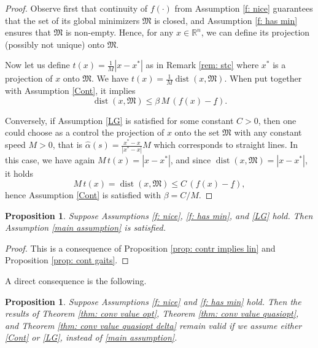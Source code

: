 \documentclass[12pt]{amsart}
\numberwithin{equation}{section}
\theoremstyle{plain}
\newtheorem{proposition}[theorem]{Proposition}
\begin{document}
\begin{proof}
Observe first that continuity of $f(\cdot)$ from Assumption \ref{f: nice} guarantees that the set of its global minimizers $\mathfrak{M}$ is closed, and Assumption \ref{f: has min} ensures that $\mathfrak{M}$ is non-empty. Hence, for any $x\in\mathbb{R}^{n}$, we can define its projection (possibly not unique) onto $\mathfrak{M}$. 

Now let us define 
$t(x) = \frac{1}{M}|x-x^{*}|$ as in Remark \ref{rem: stc} where $x^{*}$ is a projection of $x$ onto $\mathfrak{M}$. We have $t(x) = \frac{1}{M}\operatorname{dist}(x,\mathfrak{M})$. When put together with Assumption \ref{Cont}, it implies  
\begin{equation*}%
    \operatorname{dist}(x,\mathfrak{M}) \leq \beta \,M\, (f(x)-\underline{f}).
\end{equation*}

Conversely, if Assumption \ref{LG} is satisfied for some constant $C>0$, then one could choose as a control the projection of $x$ onto the set $\mathfrak{M}$ with any constant speed $M>0$, that is $\hat{\alpha}(s) = \frac{x^{*} - x}{|x^{*} - x|}M$ which corresponds to straight lines. In this case, we have again $M\,t(x) = |x-x^{*}|$, and since $\operatorname{dist}(x,\mathfrak{M}) = |x-x^{*}|$, it holds
\begin{equation*}
    M\,t(x) = \operatorname{dist}(x,\mathfrak{M}) \leq C\, (f(x)-\underline{f}),
\end{equation*}
hence Assumption \ref{Cont} is satisfied with $\beta = C/M$.
\end{proof}

\begin{proposition}
Suppose Assumptions \ref{f: nice}, \ref{f: has min}, and \ref{LG} hold. Then Assumption \ref{main assumption} is satisfied. 
\end{proposition}

\begin{proof}
This is a consequence of  Proposition \ref{prop: contr implies lin} and Proposition \ref{prop: cont gaits}.
\end{proof}


A direct consequence is the following.

\begin{proposition}\label{prop: equiv to B}
Suppose Assumptions \ref{f: nice} and \ref{f: has min} hold. 
Then the results of Theorem \ref{thm: conv value opt}, Theorem \ref{thm: conv value quasiopt}, and Theorem \ref{thm: conv value quasiopt delta} remain valid if we assume either  \ref{Cont} or \ref{LG}, instead of \ref{main assumption}. 
\end{proposition}
\end{document}
